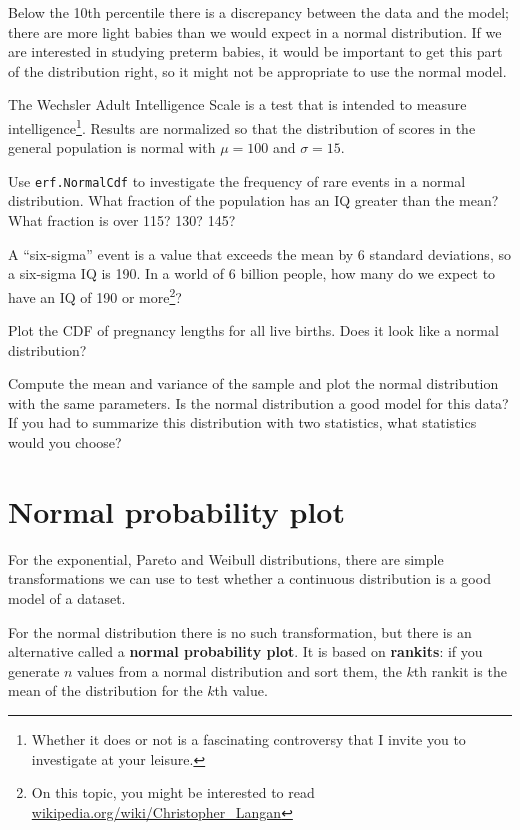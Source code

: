 \documentclass[12pt]{book}
\begin{document}
Below the 10th percentile there is a discrepancy between the data
and the model; there are more light babies than we would expect in
a normal distribution.  If we are interested in studying preterm
babies, it would be important to get this part of the distribution
right, so it might not be appropriate to use the normal
model.

\begin{ex}
The Wechsler Adult Intelligence Scale is a test that is intended
to measure intelligence\footnote{Whether it does or not is a
fascinating controversy that I invite you to investigate at your
leisure.}.  Results are normalized so that the distribution of scores
in the general population is normal with $\mu=100$ and $\sigma=15$.

Use {\tt erf.NormalCdf} to investigate the frequency of rare events
in a normal distribution.
What fraction of the population has an IQ greater than the mean?
What fraction is over 115?  130?  145?

A ``six-sigma'' event is a value that exceeds the mean by 6 standard
deviations, so a six-sigma IQ is 190.  In a world of 6 billion people,
how many do we expect to have an IQ of 190 or more\footnote{On this
  topic, you might be interested to read
  \url{wikipedia.org/wiki/Christopher_Langan}}?

\end{ex}


\begin{ex}
Plot the CDF of pregnancy lengths for all live births.  Does it
look like a normal distribution?

Compute the mean and variance of the sample and plot the normal
distribution with the same parameters.  Is the normal distribution a
good model for this data?  If you had to summarize this distribution
with two statistics, what statistics would you choose?
\end{ex}


\section{Normal probability plot}

For the exponential, Pareto and Weibull distributions, there are
simple transformations we can use to test whether a continuous
distribution is a good model of a dataset.

For the normal distribution there is no such transformation, but there
is an alternative called a {\bf normal probability plot}.  It is based
on {\bf rankits}: if you generate $n$ values from a normal
distribution and sort them, the $k$th rankit is the mean of the
distribution for the $k$th value.
\end{document}
